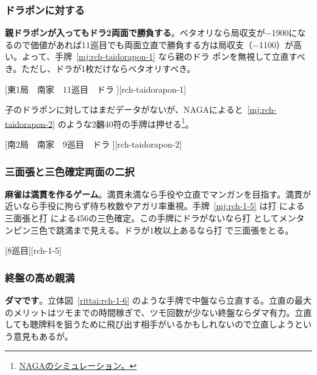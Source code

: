 \documentclass[../nankiru_main.tex]{subfiles}
\begin{document}
\subsubsection*{ドラポンに対する}

\textbf{親ドラポンが入ってもドラ2両面で勝負する}\citep[][pp.~136--137]{miinin-choice}。ベタオリなら局収支が$-$1900になるので価値があれば11巡目でも両面立直で勝負する方は局収支（$-$1100）が高い。よって、手牌~\ref{mj:rch-taidorapon-1} なら親のドラ  ポンを無視して立直すべき。ただし、ドラが1枚だけならベタオリすべき。

[東1局　南家　11巡目　ドラ ][rch-taidorapon-1]

子のドラポンに対してはまだデータがないが、NAGAによると~\ref{mj:rch-taidorapon-2} のような2飜40符の手牌は押せる\footnote{\href{https://naga.dmv.nico/htmls/81892458a0f91708d1835dd4bf25f41e8e31fe5e5ac94d050a88e61129ee5745v2_2.html?tw=1}{NAGAのシミュレーション。}}。

[南2局　南家　9巡目　ドラ ][rch-taidorapon-2]


\subsubsection*{三面張と三色確定両面の二択}

\textbf{麻雀は満貫を作るゲーム}。満貫未満なら手役や立直でマンガンを目指す。満貫が近いなら手役に拘らず待ち枚数やアガリ率重視。手牌~\ref{mj:rch-1-5} は打  による三面張と打  による456の三色確定。この手牌にドラがないなら打  としてメンタンピン三色で跳満まで見える。ドラが1枚以上あるなら打  で三面張をとる\citep{clearrain-ssk}。

[8巡目][rch-1-5]


\subsubsection*{終盤の高め親満}

\textbf{ダマです}\citep[][pp.~188--189, p.~221]{fkt}。立体図~\ref{rittai:rch-1-6} のような手牌で中盤なら立直する。立直の最大のメリットはツモまでの時間稼ぎで、ツモ回数が少ない終盤ならダマ有力。立直しても聴牌料を狙うために飛び出す相手がいるかもしれないので立直しようという意見もあるが。

\begin{rittai}[h]
  \centering
  \caption{}
  \label{rittai:rch-1-6}
\end{rittai}
\end{document}
